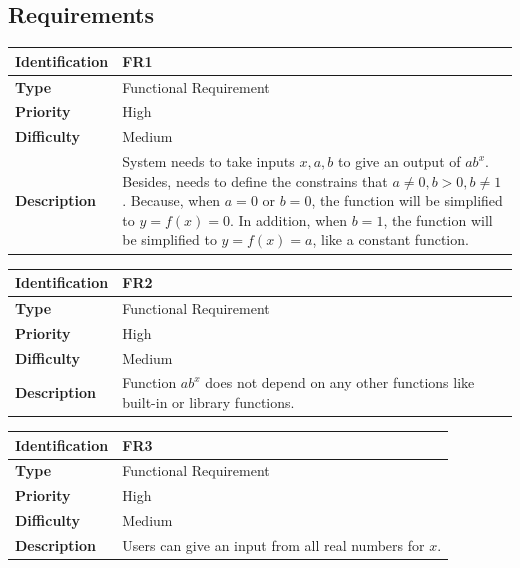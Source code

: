 \documentclass[11pt]{article}
\begin{document}
\subsection{Requirements}
\begin{center}
    \begin{tabular}{|p{3cm}|p{11cm}| }
    \hline
    \textbf{Identification} &  FR1 \\ \hline 
    \textbf{Type} & Functional Requirement\\ \hline 
    \textbf{Priority} & High  \\ \hline
    \textbf{Difficulty} & Medium  \\ \hline
    \textbf{Description} & System needs to take inputs $x, a, b$ to give an output of $ab^x$. Besides, needs to define the constrains that $a\neq0, b > 0, b \neq 1$. Because, when $a=0$ or $b=0$, the function will be simplified to $y = f(x) = 0$. In addition, when $b = 1$,  the function will be simplified to $y = f(x) = a$, like a constant function.\\ \hline
\end{tabular}
\end{center}

\begin{center}
    \begin{tabular}{|p{3cm}|p{11cm}| }
    \hline
    \textbf{Identification} &  FR2 \\ \hline 
    \textbf{Type} & Functional Requirement\\ \hline 
    \textbf{Priority} & High  \\ \hline
    \textbf{Difficulty} & Medium  \\ \hline
    \textbf{Description} & Function $ab^x$ does not depend on any other functions like built-in or library functions.\\ \hline
\end{tabular}
\end{center}

\begin{center}
    \begin{tabular}{|p{3cm}|p{11cm}| }
    \hline
    \textbf{Identification} &  FR3 \\ \hline 
    \textbf{Type} & Functional Requirement\\ \hline 
    \textbf{Priority} & High  \\ \hline
    \textbf{Difficulty} & Medium  \\ \hline
    \textbf{Description} & Users can give an input from all real numbers for $x$.\\ \hline
\end{tabular}
\end{center}
\end{document}
